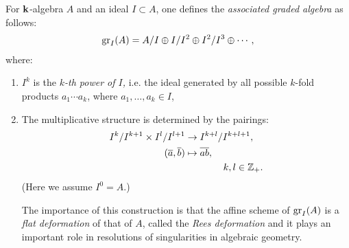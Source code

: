 For $\mathbf{k}$-algebra $A$ and an ideal $I\subset A$, one defines the \emph{associated graded algebra} as follows:
\begin{align*}
\operatorname{gr}_I(A)=A/I\oplus I/I^2\oplus I^2/I^3\oplus\cdots,
\end{align*}  
where:
\begin{enumerate}[label=(\alph*)]
\item
 $I^k$ is the \emph{$k$-th power of $I$,} i.e. the ideal generated by all possible $k$-fold products $a_1\cdots a_k$, where $a_1,\ldots,a_k\in I$,
\item The multiplicative structure is determined by the pairings:
\begin{align*}
I^k/I^{k+1}\times I^l/I^{l+1}&\to I^{k+l}/I^{k+l+1},\\
(\overline{a},\overline{b})&\mapsto\overline{ab},\\
&\qquad\qquad k,l\in\mathbb Z_+.
\end{align*}
(Here we assume $I^0=A$.)

The importance of this construction is that the affine scheme of $\operatorname{gr}_I(A)$ is a \emph{flat deformation} of that of $A$, called the \emph{Rees deformation} \cite[Section 6.4]{Eisenbud} and it plays an important role in resolutions of singularities in algebraic geometry.
\end{enumerate}

